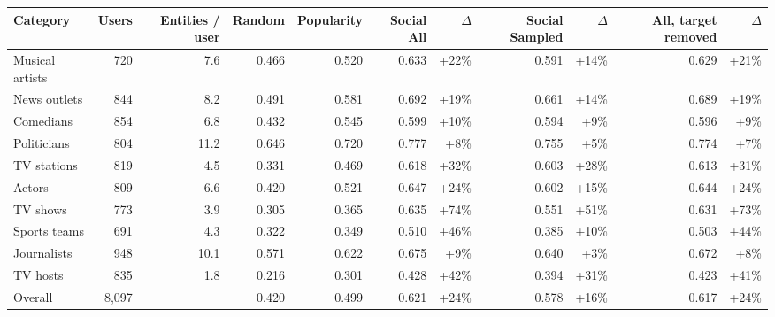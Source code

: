 \begin{tabular}{lrrrrrrrrrr}
\toprule
Category & Users & Entities / user & Random & Popularity & Social \textperiodcentered{} All & $\Delta$ & Social \textperiodcentered{} Sampled & $\Delta$ & All, target removed & $\Delta$ \\
\midrule
Musical artists & 720 & 7.6 & 0.466 & 0.520 & 0.633 & +22\% & 0.591 & +14\% & 0.629 & +21\% \\
News outlets & 844 & 8.2 & 0.491 & 0.581 & 0.692 & +19\% & 0.661 & +14\% & 0.689 & +19\% \\
Comedians & 854 & 6.8 & 0.432 & 0.545 & 0.599 & +10\% & 0.594 & +9\% & 0.596 & +9\% \\
Politicians & 804 & 11.2 & 0.646 & 0.720 & 0.777 & +8\% & 0.755 & +5\% & 0.774 & +7\% \\
TV stations & 819 & 4.5 & 0.331 & 0.469 & 0.618 & +32\% & 0.603 & +28\% & 0.613 & +31\% \\
Actors & 809 & 6.6 & 0.420 & 0.521 & 0.647 & +24\% & 0.602 & +15\% & 0.644 & +24\% \\
TV shows & 773 & 3.9 & 0.305 & 0.365 & 0.635 & +74\% & 0.551 & +51\% & 0.631 & +73\% \\
Sports teams & 691 & 4.3 & 0.322 & 0.349 & 0.510 & +46\% & 0.385 & +10\% & 0.503 & +44\% \\
Journalists & 948 & 10.1 & 0.571 & 0.622 & 0.675 & +9\% & 0.640 & +3\% & 0.672 & +8\% \\
TV hosts & 835 & 1.8 & 0.216 & 0.301 & 0.428 & +42\% & 0.394 & +31\% & 0.423 & +41\% \\
\midrule
Overall & 8,097 &  & 0.420 & 0.499 & 0.621 & +24\% & 0.578 & +16\% & 0.617 & +24\% \\
\bottomrule
\end{tabular}
